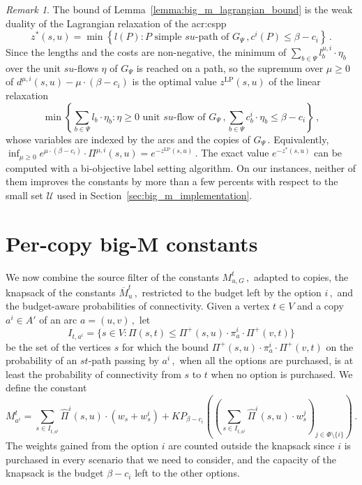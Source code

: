 \documentclass[11pt,a4paper]{report}
\theoremstyle{definition}
\theoremstyle{remark}
\newtheorem*{remark}{Remark}
\begin{document}
\begin{remark}
  The bound of Lemma~\ref{lemma:big_m_lagrangian_bound} is the weak duality of the Lagrangian relaxation of the \gls{acr:cspp}
  \begin{equation}
    z^*(s,u) = \min\left\{l(P) : \text{$P$ simple $su$-path of $G_\Psi$}\,, c^i(P) \leq \beta - c_i\right\}\,.
  \end{equation}
  Since the lengths and the costs are non-negative, the minimum of $\sum_{b \in \Psi} l^{\mu,i}_b \cdot \eta_b$ over the unit $su$-flows $\eta$ of $G_\Psi$ is reached on a path, so the supremum over $\mu \geq 0$ of $d^{\mu,i}(s,u) - \mu \cdot (\beta - c_i)$ is the optimal value $z^{\text{LP}}(s,u)$ of the linear relaxation \cite{CSP-LAGRANGIAN-RELAXATION_AHUJA_1993}
  \begin{equation}
    \min\left\{\sum_{b \in \Psi} l_b \cdot \eta_b : \text{$\eta \geq 0$ unit $su$-flow of $G_\Psi$}\,, \sum_{b \in \Psi} c^i_b \cdot \eta_b \leq \beta - c_i\right\}\,,
  \end{equation}
  whose variables are indexed by the arcs and the copies of $G_\Psi\,.$ Equivalently, $\inf_{\mu \geq 0} e^{\mu \cdot (\beta - c_i)} \cdot \Pi^{\mu,i}(s,u) = e^{-z^{\text{LP}}(s,u)}\,.$ The exact value $e^{-z^*(s,u)}$ can be computed with a bi-objective label setting algorithm. On our instances, neither of them improves the constants by more than a few percents with respect to the small set $\mathcal{U}$ used in Section~\ref{sec:big_m_implementation}.
\end{remark}


\section{Per-copy big-M constants}\label{sec:big_m_per_copy}

We now combine the source filter of the constants $M^t_{u,G}\,,$ adapted to copies, the knapsack of the constants $\overline{M}^t_u\,,$ restricted to the budget left by the option $i\,,$ and the budget-aware probabilities of connectivity. Given a vertex $t \in V$ and a copy $a^i \in A'$ of an arc $a = (u,v)\,,$ let
\begin{equation}
  I_{t,a^i} = \{s \in V : \Pi(s,t) \leq \Pi^+(s,u) \cdot \pi^i_a \cdot \Pi^+(v,t)\}
\end{equation}
be the set of the vertices $s$ for which the bound $\Pi^+(s,u) \cdot \pi^i_a \cdot \Pi^+(v,t)$ on the probability of an $st$-path passing by $a^i\,,$ when all the options are purchased, is at least the probability of connectivity from $s$ to $t$ when no option is purchased. We define the constant
\begin{equation}\label{eq:big_m_per_copy}
  M^t_{a^i} = \sum_{s \in I_{t,a^i}} \widehat{\Pi}^i(s,u) \cdot \left(w_s + w^i_s\right) + KP_{\beta - c_i}\left(\left(\sum_{s \in I_{t,a^i}} \widehat{\Pi}^i(s,u) \cdot w^j_s\right)_{j \in \Phi \setminus \{i\}}\right)\,.
\end{equation}
The weights gained from the option $i$ are counted outside the knapsack since $i$ is purchased in every scenario that we need to consider, and the capacity of the knapsack is the budget $\beta - c_i$ left to the other options.
\end{document}
